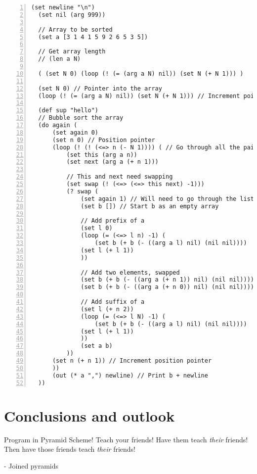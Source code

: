\documentclass[aip,jcp,reprint]{revtex4-1}
\begin{document}
\begin{lstlisting}[language=psll,frame=tb,numbers=left,aboveskip=3mm,belowskip=3mm]
  (set newline "\n")
  (set nil (arg 999))
  
  // Array to be sorted
  (set a [3 1 4 1 5 9 2 6 5 3 5])
  
  // Get array length
  // (len a N)
  
  ( (set N 0) (loop (! (= (arg a N) nil)) (set N (+ N 1))) )
  
  (set N 0) // Pointer into the array
  (loop (! (= (arg a N) nil)) (set N (+ N 1))) // Increment pointer until goes off the end
  
  (def sup "hello")
  // Bubble sort the array
  (do again (
      (set again 0)
      (set n 0) // Position pointer
      (loop (! (! (<=> n (- N 1)))) ( // Go through all the pairs
          (set this (arg a n))
          (set next (arg a (+ n 1)))
  
          // This and next need swapping
          (set swap (! (<=> (<=> this next) -1)))
          (? swap (
              (set again 1) // Will need to go through the list again
              (set b []) // Start b as an empty array
              
              // Add prefix of a
              (set l 0)
              (loop (= (<=> l n) -1) (
                  (set b (+ b (- ((arg a l) nil) (nil nil))))
              (set l (+ l 1))
              ))
  
              // Add two elements, swapped
              (set b (+ b (- ((arg a (+ n 1)) nil) (nil nil))))
              (set b (+ b (- ((arg a (+ n 0)) nil) (nil nil))))
  
              // Add suffix of a
              (set l (+ n 2))
              (loop (= (<=> l N) -1) (
                  (set b (+ b (- ((arg a l) nil) (nil nil))))
              (set l (+ l 1))
              ))
              (set a b)
          ))
      (set n (+ n 1)) // Increment position pointer
      ))
      (out (* a ",") newline) // Print b + newline
  ))
\end{lstlisting}

\section{Conclusions and outlook}
Program in Pyramid Scheme! Teach your friends! Have them teach \emph{their} friends! Then have those friends teach \emph{their} friends!

- Joined pyramids
\end{document}
